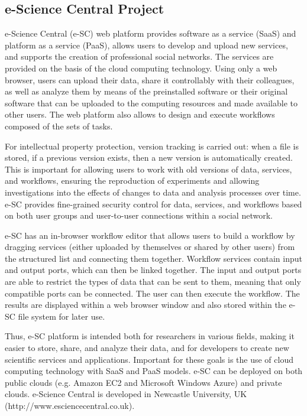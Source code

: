 \documentclass[procedia]{easychair}
\begin{document}
\subsection{e-Science Central Project}

e-Science Central (e-SC) web platform \cite{20} provides software as a service (SaaS) and platform as a service (PaaS), allows users to develop and upload new services, and supports the creation of professional social networks. The services are provided on the basis of the cloud computing technology. Using only a web browser, users can upload their data, share it controllably with their colleagues, as well as analyze them by means of the preinstalled software or their original software that can be uploaded to the computing resources and made available to other users. The web platform also allows to design and execute workflows composed of the sets of tasks. 

For intellectual property protection, version tracking is carried out: when a file is stored, if a previous version exists, then a new version is automatically created. This is important for allowing users to work with old versions of data, services, and workflows, ensuring the reproduction of experiments and allowing investigations into the effects of changes to data and analysis processes over time. e-SC provides fine-grained security control for data, services, and workflows based on both user groups and user-to-user connections within a social network.

e-SC has an in-browser workflow editor that allows users to build a workflow by dragging services (either uploaded by themselves or shared by other users) from the structured list and connecting them together. Workflow services contain input and output ports, which can then be linked together. The input and output ports are able to restrict the types of data that can be sent to them, meaning that only compatible ports can be connected. The user can then execute the workflow. The results are displayed within a web browser window and also stored within the e-SC file system for later use.

Thus, e-SC platform is intended both for researchers in various fields, making it easier to store, share, and analyze their data, and for developers to create new scientific services and applications. Important for these goals is the use of cloud computing technology with SaaS and PaaS models. e-SC can be deployed on both public clouds (e.g. Amazon EC2 and Microsoft Windows Azure) and private clouds. e-Science Central is developed in Newcastle University, UK (http://www.esciencecentral.co.uk).
\end{document}
